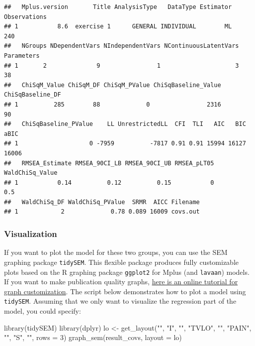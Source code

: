 \documentclass[
]{book}
\newenvironment{Shaded}{\begin{snugshade}}{\end{snugshade}}
\newcommand{\AttributeTok}[1]{\textcolor[rgb]{0.77,0.63,0.00}{#1}}
\newcommand{\DecValTok}[1]{\textcolor[rgb]{0.00,0.00,0.81}{#1}}
\newcommand{\FunctionTok}[1]{\textcolor[rgb]{0.00,0.00,0.00}{#1}}
\newcommand{\NormalTok}[1]{#1}
\newcommand{\OtherTok}[1]{\textcolor[rgb]{0.56,0.35,0.01}{#1}}
\newcommand{\StringTok}[1]{\textcolor[rgb]{0.31,0.60,0.02}{#1}}
\begin{document}
\begin{verbatim}
##   Mplus.version       Title AnalysisType   DataType Estimator Observations
## 1           8.6  exercise 1      GENERAL INDIVIDUAL        ML          240
##   NGroups NDependentVars NIndependentVars NContinuousLatentVars Parameters
## 1       2              9                1                     3         38
##   ChiSqM_Value ChiSqM_DF ChiSqM_PValue ChiSqBaseline_Value ChiSqBaseline_DF
## 1          285        88             0                2316               90
##   ChiSqBaseline_PValue    LL UnrestrictedLL  CFI  TLI   AIC   BIC  aBIC
## 1                    0 -7959          -7817 0.91 0.91 15994 16127 16006
##   RMSEA_Estimate RMSEA_90CI_LB RMSEA_90CI_UB RMSEA_pLT05 WaldChiSq_Value
## 1           0.14          0.12          0.15           0             0.5
##   WaldChiSq_DF WaldChiSq_PValue  SRMR  AICC Filename
## 1            2             0.78 0.089 16009 covs.out
\end{verbatim}

\hypertarget{visualization}{%
\subsubsection{Visualization}\label{visualization}}

If you want to plot the model for these two groups,
you can use the SEM graphing package \texttt{tidySEM}.
This flexible package produces fully customizable plots based on the R graphing package \texttt{ggplot2} for Mplus (and \texttt{lavaan}) models.
If you want to make publication quality graphs, \href{https://cjvanlissa.github.io/tidySEM/articles/Plotting_graphs.html}{here is an online tutorial for graph customization}.
The script below demonstrates how to plot a model using \texttt{tidySEM}. Assuming that we only want to visualize the regression part of the model, you could specify:

\begin{Shaded}
\begin{Highlighting}[]
\FunctionTok{library}\NormalTok{(tidySEM)}
\FunctionTok{library}\NormalTok{(dplyr)}
\NormalTok{lo }\OtherTok{\textless{}{-}} \FunctionTok{get\_layout}\NormalTok{(}\StringTok{""}\NormalTok{,     }\StringTok{"I"}\NormalTok{,   }\StringTok{""}\NormalTok{,}
                 \StringTok{"TVLO"}\NormalTok{, }\StringTok{""}\NormalTok{,   }\StringTok{"PAIN"}\NormalTok{,}
                 \StringTok{""}\NormalTok{,     }\StringTok{"S"}\NormalTok{,   }\StringTok{""}\NormalTok{, }\AttributeTok{rows =} \DecValTok{3}\NormalTok{)}
\FunctionTok{graph\_sem}\NormalTok{(result\_covs, }\AttributeTok{layout =}\NormalTok{ lo)}
\end{Highlighting}
\end{Shaded}
\end{document}
